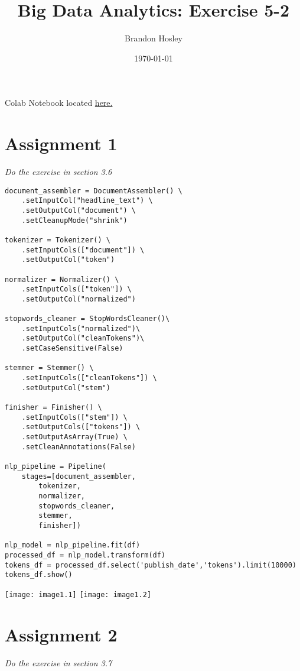 \documentclass[]{article}
\title{Big Data Analytics: Exercise 5-2}
\author{Brandon Hosley}
\date{\today}
\begin{document}
\maketitle

\vspace{-1.5em}

Colab Notebook located
\href{https://colab.research.google.com/drive/1rxCV1SSGTpGZSGphk5AH8Iuuz3TFCNxB?usp=sharing}{here.}

\vspace{-1.5em}

\section*{Assignment 1}
\vspace{-1em}
\emph{ Do the exercise in section 3.6 }
\vspace{-0.5em}

\begin{verbatim}
document_assembler = DocumentAssembler() \
	.setInputCol("headline_text") \
	.setOutputCol("document") \
	.setCleanupMode("shrink")

tokenizer = Tokenizer() \
	.setInputCols(["document"]) \
	.setOutputCol("token")

normalizer = Normalizer() \
	.setInputCols(["token"]) \
	.setOutputCol("normalized")

stopwords_cleaner = StopWordsCleaner()\
	.setInputCols("normalized")\
	.setOutputCol("cleanTokens")\
	.setCaseSensitive(False)

stemmer = Stemmer() \
	.setInputCols(["cleanTokens"]) \
	.setOutputCol("stem")

finisher = Finisher() \
	.setInputCols(["stem"]) \
	.setOutputCols(["tokens"]) \
	.setOutputAsArray(True) \
	.setCleanAnnotations(False)

nlp_pipeline = Pipeline(
	stages=[document_assembler, 
		tokenizer,
		normalizer,
		stopwords_cleaner, 
		stemmer, 
		finisher])

nlp_model = nlp_pipeline.fit(df)
processed_df = nlp_model.transform(df)
tokens_df = processed_df.select('publish_date','tokens').limit(10000)
tokens_df.show()
\end{verbatim}
\texttt{[image: image1.1]}
\texttt{[image: image1.2]}

\section*{Assignment 2}
\emph{ Do the exercise in section 3.7 }
\end{document}
